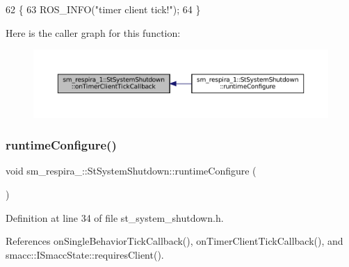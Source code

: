 \begin{DoxyCode}
62     \{
63         ROS\_INFO(\textcolor{stringliteral}{"timer client tick!"});
64     \}
\end{DoxyCode}
Here is the caller graph for this function\+:
\nopagebreak
\begin{figure}[H]
\begin{center}
\leavevmode
\includegraphics[width=350pt]{structsm__respira__1_1_1StSystemShutdown_a4c113d1875fb5a538c45973b87900ff6_icgraph}
\end{center}
\end{figure}
\mbox{\label{structsm__respira__1_1_1StSystemShutdown_a0e64b317e2720facbfeabc99956bf071}} 
\subsubsection{\texorpdfstring{runtime\+Configure()}{runtimeConfigure()}}
{\footnotesize\ttfamily void sm\+\_\+respira\+\_\+::\+St\+System\+Shutdown\+::runtime\+Configure (\begin{DoxyParamCaption}{ }\end{DoxyParamCaption})\hspace{0.3cm}{\ttfamily [inline]}}



Definition at line 34 of file st\+\_\+system\+\_\+shutdown.\+h.



References on\+Single\+Behavior\+Tick\+Callback(), on\+Timer\+Client\+Tick\+Callback(), and smacc\+::\+I\+Smacc\+State\+::requires\+Client().


